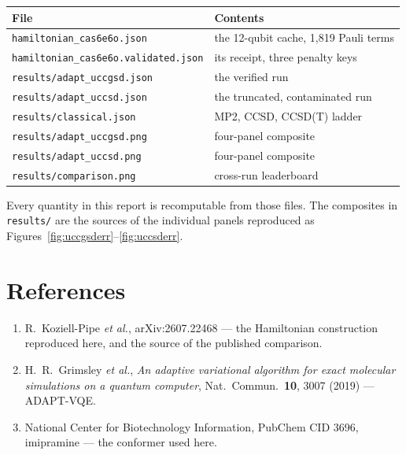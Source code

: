 \documentclass[11pt,a4paper]{article}
\newcommand{\code}[1]{\texttt{\small #1}}
\begin{document}
\begin{center}
\small
\begin{tabular}{ll}
\toprule
File & Contents \\
\midrule
\code{hamiltonian\_cas6e6o.json}           & the 12-qubit cache, 1{,}819 Pauli terms \\
\code{hamiltonian\_cas6e6o.validated.json} & its receipt, three penalty keys \\
\code{results/adapt\_uccgsd.json}          & the verified run \\
\code{results/adapt\_uccsd.json}           & the truncated, contaminated run \\
\code{results/classical.json}              & MP2, CCSD, CCSD(T) ladder \\
\code{results/adapt\_uccgsd.png}           & four-panel composite \\
\code{results/adapt\_uccsd.png}            & four-panel composite \\
\code{results/comparison.png}              & cross-run leaderboard \\
\bottomrule
\end{tabular}
\end{center}

Every quantity in this report is recomputable from those files. The composites
in \code{results/} are the sources of the individual panels reproduced as
Figures~\ref{fig:uccgsderr}--\ref{fig:uccsderr}.

\section*{References}
\small
\begin{enumerate}[leftmargin=1.4em,itemsep=0.1em]
\item R.\ Koziell-Pipe \emph{et al.}, arXiv:2607.22468 --- the Hamiltonian
  construction reproduced here, and the source of the published comparison.
\item H.\ R.\ Grimsley \emph{et al.}, \emph{An adaptive variational algorithm
  for exact molecular simulations on a quantum computer}, Nat.\ Commun.\
  \textbf{10}, 3007 (2019) --- ADAPT-VQE.
\item National Center for Biotechnology Information, PubChem CID 3696,
  imipramine --- the conformer used here.
\end{enumerate}
\end{document}
